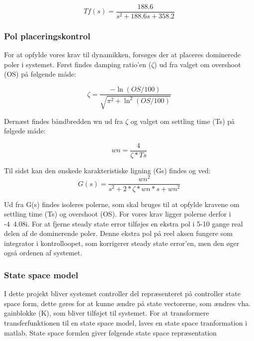 \begin{equation}
Tf(s) = \frac{188.6}{s^2 + 188.6 s + 358.2}
\end{equation}
    

\subsubsection{Pol placeringskontrol}
For at opfylde vores krav til dynamikken, forsøges der at placeres dominerede poler i systemet. Først findes damping ratio'en ($ \zeta $) ud fra valget om overshoot (OS) på følgende måde: 

\begin{equation}
\zeta = \frac{-\ln(OS/100)}{\sqrt{\pi^2+\ln^2(OS/100)}}
\end{equation} 

Dernæst findes båndbredden wn ud fra $ \zeta $ og valget om settling time (Ts) på følgede måde:

\begin{equation}
wn = \frac{4}{\zeta*Ts}
\end{equation} 

Til sidst kan den ønskede karakteristiske ligning (Gs) findes og ved:
\begin{equation}
G(s) = \frac{wn^2}{s^2+2*\zeta*wn*s+wn^2}
\end{equation}

Ud fra G(s) findes isoleres polerne, som skal bruges til at opfylde kravene om settling time (Ts) og overshoot (OS). For vores krav ligger polerne  derfor i -4\textpm\ 4.08i. For at fjerne steady state error tilføjes en ekstra pol i 5-10 gange real delen af de dominerende poler. Denne ekstra pol på reel aksen fungere som integrator i kontrolloopet, som korrigerer steady state error'en, men den øger også ordenen af systemet.


\subsubsection{State space model}

I dette projekt bliver systemet controller del repræsenteret på controller state space form, dette gøres for at kunne ændre på state vectorerne, som ændres vha. gainblokke (K), som bliver tilføjet til systemet. For at transformere transferfunktionen til en state space model, laves en state space tranformation i matlab. State space formlen giver følgende state space repræsentation

